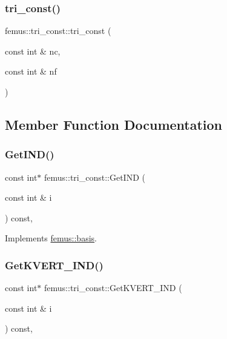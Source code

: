 \subsubsection{\texorpdfstring{tri\+\_\+const()}{tri\_const()}}
{\footnotesize\ttfamily femus\+::tri\+\_\+const\+::tri\+\_\+const (\begin{DoxyParamCaption}\item[{const int \&}]{nc,  }\item[{const int \&}]{nf }\end{DoxyParamCaption})\hspace{0.3cm}{\ttfamily [inline]}}



\subsection{Member Function Documentation}
\mbox{\label{classfemus_1_1tri__const_a8acedcfc88051ca62d624106f0d78363}} 
\subsubsection{\texorpdfstring{Get\+I\+N\+D()}{GetIND()}}
{\footnotesize\ttfamily const int$\ast$ femus\+::tri\+\_\+const\+::\+Get\+I\+ND (\begin{DoxyParamCaption}\item[{const int \&}]{i }\end{DoxyParamCaption}) const\hspace{0.3cm}{\ttfamily [inline]}, {\ttfamily [virtual]}}



Implements \mbox{\hyperlink{classfemus_1_1basis_a3f63ad97ce70cd4a1196ede69f1f144b}{femus\+::basis}}.

\mbox{\label{classfemus_1_1tri__const_a3fd58ad3e2cc9c37e4a92fcab3b11a20}} 
\subsubsection{\texorpdfstring{Get\+K\+V\+E\+R\+T\+\_\+\+I\+N\+D()}{GetKVERT\_IND()}}
{\footnotesize\ttfamily const int$\ast$ femus\+::tri\+\_\+const\+::\+Get\+K\+V\+E\+R\+T\+\_\+\+I\+ND (\begin{DoxyParamCaption}\item[{const int \&}]{i }\end{DoxyParamCaption}) const\hspace{0.3cm}{\ttfamily [inline]}, {\ttfamily [virtual]}}



